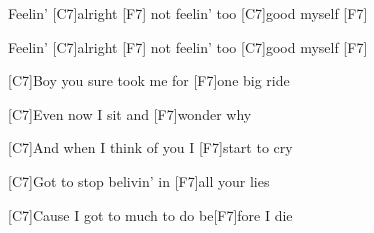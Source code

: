 \documentclass[12pt]{article}
\begin{document}
\vspace{0.00mm}

\vspace{0.00mm}
\setlength{\parindent}{0.00mm}
\setlength{\leftskip}{-12.50mm}
\setlength{\rightskip}{0.00mm}
\raggedright
Feelin' [C7]alright   [F7]  not feelin' too [C7]good myself  [F7]  
\vspace{0.00mm}

\vspace{0.00mm}
\setlength{\parindent}{0.00mm}
\setlength{\leftskip}{-12.50mm}
\setlength{\rightskip}{0.00mm}
\raggedright
Feelin' [C7]alright   [F7]  not feelin' too [C7]good myself  [F7]  
\vspace{0.00mm}

\vspace{0.00mm}
\setlength{\parindent}{0.00mm}
\setlength{\leftskip}{-12.50mm}
\setlength{\rightskip}{0.00mm}
\raggedright

\vspace{0.00mm}

\vspace{0.00mm}
\setlength{\parindent}{0.00mm}
\setlength{\leftskip}{-12.50mm}
\setlength{\rightskip}{0.00mm}
\raggedright
[C7]Boy you sure took me for [F7]one big ride
\vspace{0.00mm}

\vspace{0.00mm}
\setlength{\parindent}{0.00mm}
\setlength{\leftskip}{-12.50mm}
\setlength{\rightskip}{0.00mm}
\raggedright
[C7]Even now I sit and [F7]wonder why
\vspace{0.00mm}

\vspace{0.00mm}
\setlength{\parindent}{0.00mm}
\setlength{\leftskip}{-12.50mm}
\setlength{\rightskip}{0.00mm}
\raggedright
[C7]And when I think of you I [F7]start to cry
\vspace{0.00mm}

\vspace{0.00mm}
\setlength{\parindent}{0.00mm}
\setlength{\leftskip}{-12.50mm}
\setlength{\rightskip}{0.00mm}
\raggedright
[C7]Got to stop belivin' in [F7]all your lies
\vspace{0.00mm}

\vspace{0.00mm}
\setlength{\parindent}{0.00mm}
\setlength{\leftskip}{-12.50mm}
\setlength{\rightskip}{0.00mm}
\raggedright
[C7]Cause I got to much to do be[F7]fore I die
\vspace{0.00mm}

\vspace{0.00mm}
\setlength{\parindent}{0.00mm}
\setlength{\leftskip}{-12.50mm}
\setlength{\rightskip}{0.00mm}
\raggedright
\end{document}
